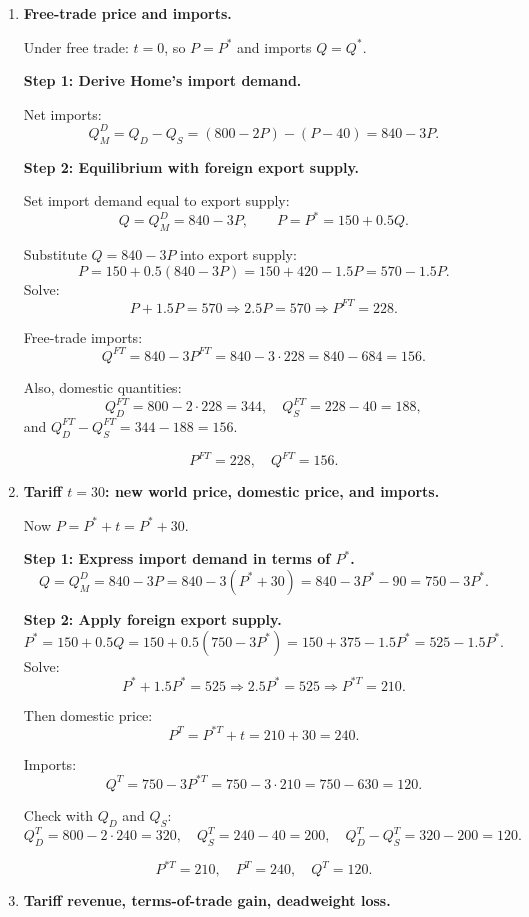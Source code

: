 \documentclass[12pt]{article}
\begin{document}
\begin{enumerate}[label=(\arabic*)]

\item \textbf{Free-trade price and imports.}

Under free trade: $t=0$, so $P = P^*$ and imports $Q = Q^*$.  

\textbf{Step 1: Derive Home’s import demand.}

Net imports:
\[
Q_M^D = Q_D - Q_S = (800 - 2P) - (P - 40) = 840 - 3P.
\]

\textbf{Step 2: Equilibrium with foreign export supply.}

Set import demand equal to export supply:
\[
Q = Q_M^D = 840 - 3P, \qquad P = P^* = 150 + 0.5Q.
\]

Substitute $Q=840 - 3P$ into export supply:
\[
P = 150 + 0.5(840 - 3P) = 150 + 420 - 1.5P = 570 - 1.5P.
\]
Solve:
\[
P + 1.5P = 570 \Rightarrow 2.5P = 570 \Rightarrow P^{FT} = 228.
\]

Free-trade imports:
\[
Q^{FT} = 840 - 3P^{FT} = 840 - 3\cdot 228 = 840 - 684 = 156.
\]

Also, domestic quantities:
\[
Q_D^{FT} = 800 - 2\cdot 228 = 344,\quad Q_S^{FT} = 228 - 40 = 188,
\]
and $Q_D^{FT} - Q_S^{FT} = 344 - 188 = 156$.

\[
\boxed{P^{FT} = 228,\quad Q^{FT} = 156.}
\]

\item \textbf{Tariff $t = 30$: new world price, domestic price, and imports.}

Now $P = P^* + t = P^* + 30$.

\textbf{Step 1: Express import demand in terms of $P^*$.}
\[
Q = Q_M^D = 840 - 3P = 840 - 3(P^* + 30) = 840 - 3P^* - 90 = 750 - 3P^*.
\]

\textbf{Step 2: Apply foreign export supply.}
\[
P^* = 150 + 0.5Q = 150 + 0.5(750 - 3P^*) = 150 + 375 - 1.5P^* = 525 - 1.5P^*.
\]
Solve:
\[
P^* + 1.5P^* = 525 \Rightarrow 2.5P^* = 525 \Rightarrow P^{*T} = 210.
\]

Then domestic price:
\[
P^{T} = P^{*T} + t = 210 + 30 = 240.
\]

Imports:
\[
Q^{T} = 750 - 3P^{*T} = 750 - 3\cdot 210 = 750 - 630 = 120.
\]

Check with $Q_D$ and $Q_S$:
\[
Q_D^{T} = 800 - 2\cdot 240 = 320,\quad Q_S^{T} = 240 - 40 = 200,\quad
Q_D^{T} - Q_S^{T} = 320 - 200 = 120.
\]

\[
\boxed{P^{*T} = 210,\quad P^{T} = 240,\quad Q^{T} = 120.}
\]

\item \textbf{Tariff revenue, terms-of-trade gain, deadweight loss.}


\end{enumerate}
\end{document}
